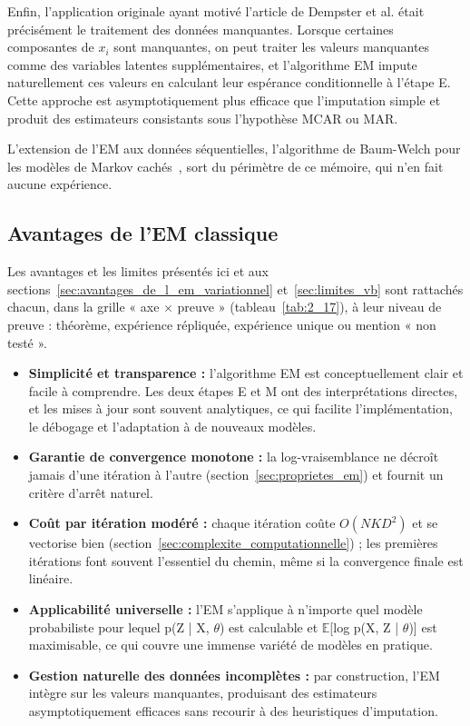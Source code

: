Enfin, l'application originale ayant motivé l'article de Dempster et al. était précisément le traitement des données manquantes. Lorsque certaines composantes de $x_{i}$ sont manquantes, on peut traiter les valeurs manquantes comme des variables latentes supplémentaires, et l'algorithme EM impute naturellement ces valeurs en calculant leur espérance conditionnelle à l'étape E. Cette approche est asymptotiquement plus efficace que l'imputation simple et produit des estimateurs consistants sous l'hypothèse MCAR ou MAR.

L'extension de l'EM aux données séquentielles, l'algorithme de Baum-Welch pour les modèles de Markov cachés~\cite{baum1970}, sort du périmètre de ce mémoire, qui n'en fait aucune expérience.

\subsection{Avantages de l'EM classique}\label{sec:avantages_de_l_em_classique}
Les avantages et les limites présentés ici et aux sections~\ref{sec:avantages_de_l_em_variationnel} et~\ref{sec:limites_vb} sont rattachés chacun, dans la grille « axe $\times$ preuve » (tableau~\ref{tab:2_17}), à leur niveau de preuve : théorème, expérience répliquée, expérience unique ou mention « non testé ».
\begin{itemize}
\item \textbf{Simplicité et transparence : }l'algorithme EM est conceptuellement clair et facile à comprendre. Les deux étapes E et M ont des interprétations directes, et les mises à jour sont souvent analytiques, ce qui facilite l'implémentation, le débogage et l'adaptation à de nouveaux modèles.
\item \textbf{Garantie de convergence monotone : }la log-vraisemblance ne décroît jamais d'une itération à l'autre (section~\ref{sec:proprietes_em}) et fournit un critère d'arrêt naturel.
\item \textbf{Coût par itération modéré : }chaque itération coûte $O(NKD^{2})$ et se vectorise bien (section~\ref{sec:complexite_computationnelle}) ; les premières itérations font souvent l'essentiel du chemin, même si la convergence finale est linéaire.
\item \textbf{Applicabilité universelle : }l'EM s'applique à n'importe quel modèle probabiliste pour lequel p(Z | X, $\theta $) est calculable et $\mathbb{E}$[log p(X, Z | $\theta $)] est maximisable, ce qui couvre une immense variété de modèles en pratique.
\item \textbf{Gestion naturelle des données incomplètes : }par construction, l'EM intègre sur les valeurs manquantes, produisant des estimateurs asymptotiquement efficaces sans recourir à des heuristiques d'imputation.
\end{itemize}
